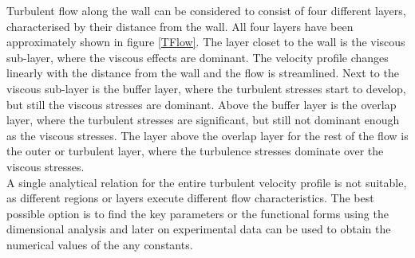Turbulent flow along the wall can be considered to consist of four different layers, characterised by their distance from the wall. All four layers have been approximately shown in figure \ref{TFlow}. The layer closet to the wall is the viscous sub-layer, where the viscous effects are dominant. The velocity profile changes linearly with the distance from the wall and the flow is streamlined. Next to the viscous sub-layer is the buffer layer, where the turbulent stresses start to develop, but still the viscous stresses are dominant. Above the buffer layer is the overlap layer, where the turbulent stresses are significant, but still not dominant enough as the viscous stresses. The layer above the overlap layer for the rest of the flow is the outer or turbulent layer, where the turbulence stresses dominate over the viscous stresses.\\
%
A single analytical relation for the entire turbulent velocity profile is not suitable, as different regions or layers execute different flow characteristics. The best possible option is to find the key parameters or the functional forms using the dimensional analysis and later on experimental data can be used to obtain the numerical values of the any constants.\\


